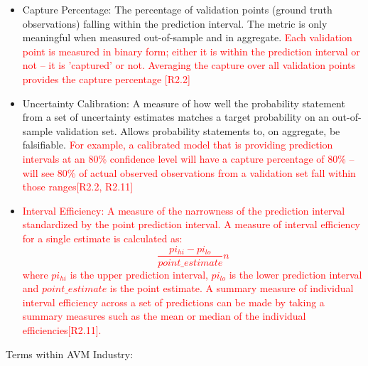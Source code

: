 \documentclass[colTwo]{anon}
\theoremstyle{definition}
\begin{document}
\begin{itemize}
\item Capture Percentage: The percentage of validation points (ground truth observations) falling within the prediction interval. The metric is only meaningful when measured out-of-sample and in aggregate. \textcolor{red}{Each validation point is measured in binary form; either it is within the prediction interval or not -- it is 'captured' or not. Averaging the capture over all validation points provides the capture percentage [R2.2]}
\item Uncertainty Calibration: A measure of how well the probability statement from a set of uncertainty estimates matches a target probability on an out-of-sample validation set. Allows probability statements to, on aggregate, be falsifiable. \textcolor{red}{For example, a calibrated model that is providing prediction intervals at an 80\% confidence level will have a capture percentage of 80\% -- will see 80\% of actual observed observations from a validation set fall within those ranges[R2.2, R2.11]}
\item \textcolor{red}{Interval Efficiency: A measure of the narrowness of the prediction interval standardized by the point prediction interval. A measure of interval efficiency for a single estimate is calculated as: 
\[\frac{pi_{hi} - pi_{lo}}{point\_estimate}{n}\] where \(pi_{hi}\) is the upper prediction interval, \(pi_{lo}\) is the lower prediction interval and \(point\_estimate\) is the point estimate. A summary measure of individual interval efficiency across a set of predictions can be made by taking a summary measures such as the mean or median of the individual efficiencies[R2.11].}

\end{itemize}

Terms within AVM Industry:
\end{document}
